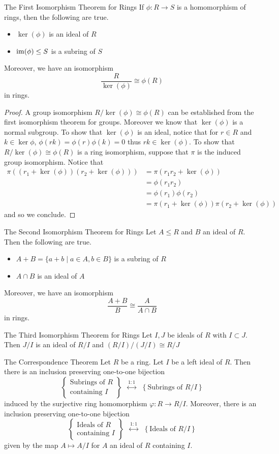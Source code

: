 \documentclass[a4paper]{article}
\begin{document}
\begin{thm}{The First Isomorphism Theorem for Rings}{} If $\phi:R\to S$ is a homomorphism of rings, then the following are true. 
\begin{itemize}
\item $\ker(\phi)$ is an ideal of $R$
\item $\operatorname{im}(\phi)\leq S$ is a subring of $S$
\end{itemize}
Moreover, we have an isomorphism $$\frac{R}{\ker(\phi)}\cong\phi(R)$$ in rings. \tcbline
\begin{proof}
A group isomorphism $R/\ker(\phi)\cong\phi(R)$ can be established from the first isomorphism theorem for groups. Moreover we know that $\ker(\phi)$ is a normal subgroup. To show that $\ker(\phi)$ is an ideal, notice that for $r\in R$ and $k\in\ker\phi$, $\phi(rk)=\phi(r)\phi(k)=0$ thus $rk\in\ker(\phi)$. To show that $R/\ker(\phi)\cong\phi(R)$ is a ring isomorphism, suppose that $\pi$ is the induced group isomorphism. Notice that 
\begin{align*}
\pi((r_1+\ker(\phi))(r_2+\ker(\phi)))&=\pi(r_1r_2+\ker(\phi))\\
&=\phi(r_1r_2)\\
&=\phi(r_1)\phi(r_2)\\
&=\pi(r_1+\ker(\phi))\pi(r_2+\ker(\phi))
\end{align*}
and so we conclude. 
\end{proof}
\end{thm}

\begin{thm}{The Second Isomorphism Theorem for Rings}{} Let $A\leq R$ and $B$ an ideal of $R$. Then the following are true. 
\begin{itemize}
\item $A+B=\{a+b\;|\;a\in A,b\in B\}$ is a subring of $R$
\item $A\cap B$ is an ideal of $A$
\end{itemize}
Moreover, we have an isomorphism $$\frac{A+B}{B}\cong\frac{A}{A\cap B}$$ in rings. 
\end{thm}

\begin{thm}{The Third Isomorphism Theorem for Rings}{} Let $I,J$ be ideals of $R$ with $I\subset J$. Then $J/I$ is an ideal of $R/I$ and $(R/I)/(J/I)\cong R/J$
\end{thm}

\begin{thm}{The Correspondence Theorem}{} Let $R$ be a ring. Let $I$ be a left ideal of $R$. Then there is an inclusion preserving one-to-one bijection $$\left\{\substack{\text{Subrings of }R\\\text{containing }I}\right\}\;\;\overset{1:1}{\longleftrightarrow}\;\;\left\{\text{Subrings of }R/I\right\}$$ induced by the surjective ring homomorphism $\varphi:R\to R/I$. Moreover, there is an inclusion preserving one-to-one bijection $$\left\{\substack{\text{Ideals of }R\\\text{containing }I}\right\}\;\;\overset{1:1}{\longleftrightarrow}\;\;\left\{\text{Ideals of }R/I\right\}$$ given by the map $A\mapsto A/I$ for $A$ an ideal of $R$ containing $I$. 
\end{thm}
\end{document}
